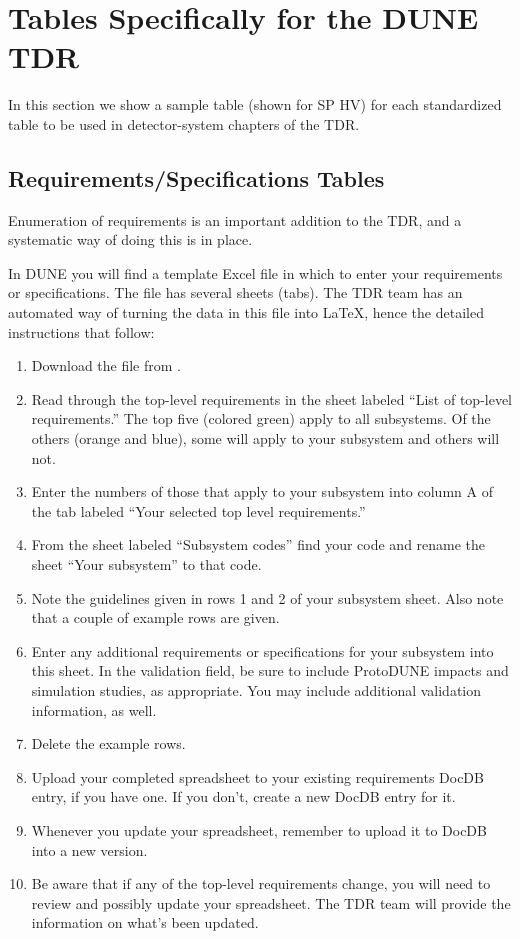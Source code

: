 \FloatBarrier

\section{Tables Specifically for the DUNE TDR}
\label{sec:tables}

In this section we show a sample table (shown for SP HV) for each standardized table to be used in detector-system chapters of the TDR. 

\subsection{Requirements/Specifications Tables}
\label{sec:tables-req}

Enumeration of requirements is an important addition to the TDR, and a systematic way of doing this is in place.  

In DUNE  you will find a template Excel file in which to enter your requirements or specifications.  The file has several sheets (tabs). The TDR team has an automated way of turning the data in this file into LaTeX, hence the detailed instructions that follow:

\begin{enumerate}
\item Download the file from .
\item Read through the top-level requirements in the sheet labeled ``List of top-level requirements.''  The top five (colored green) apply to all subsystems. Of the others (orange and blue), some will apply to your subsystem and others will not.
\item Enter the numbers of those that apply to your subsystem into column A of the tab labeled ``Your selected top level requirements.''
\item From the sheet labeled ``Subsystem codes'' find your code and rename the sheet ``Your subsystem'' to that code.
\item Note the guidelines given in rows 1 and 2 of your subsystem sheet. Also note that a couple of example rows are given.
\item  Enter any additional requirements or specifications for your subsystem into this sheet.  In the validation field, be sure to include ProtoDUNE impacts and simulation studies, as appropriate. You may include additional validation information, as well.
\item Delete the example rows.
\item Upload your completed spreadsheet to your existing requirements DocDB entry, if you have one. If you don't, create a new DocDB entry for it.
\item Whenever you update your spreadsheet, remember to upload it to DocDB into a new version.
\item Be aware that if any of the top-level requirements change, you will need to review and possibly update your spreadsheet.  The TDR team will provide the information on what's been updated.
\end{enumerate}

